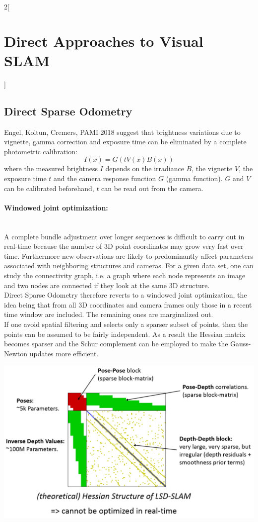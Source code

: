 \documentclass[oneside,fontsize=11pt,paper=a4]{scrartcl}
\newenvironment{myfigure}
  {\par\medskip\noindent\minipage{\linewidth}}
  {\endminipage\par\medskip}
\begin{document}
\begin{multicols}{2}[\section{Direct Approaches to Visual SLAM}]
\subsection{Direct Sparse Odometry}
Engel, Koltun, Cremers, PAMI 2018 suggest that brightness variations due to vignette, gamma correction and exposure time can be eliminated by a complete photometric calibration: \begin{equation*}
    I(x)=G \left(t V(x) B(x) \right)
\end{equation*}
where the measured brightness $I$ depends on the irradiance $B$, the vignette $V$, the exposure time $t$ and the camera response function $G$ (gamma function).
$G$ and $V$ can be calibrated beforehand, $t$ can be read out from the camera. \par

\paragraph{Windowed joint optimization:}\mbox{}\\
A complete bundle adjustment over longer sequences is difficult to carry out in real-time because the number of 3D point coordinates may grow very fast over time.
Furthermore new observations are likely to predominantly affect parameters associated with neighboring structures and cameras.
For a given data set, one can study the connectivity graph, i.e. a graph where each node represents an image and two nodes are connected if they look at the same 3D structure.\\
Direct Sparse Odometry therefore reverts to a windowed joint optimization, the idea being that from all 3D coordinates and camera frames only those in a recent time window are included. The remaining ones are marginalized out.\\
If one avoid spatial filtering and selects only a sparser subset of points, then the points can be assumed to be fairly independent.
As a result the Hessian matrix becomes sparser and the Schur complement can be employed to make the Gauss-Newton updates more efficient.

\begin{myfigure}
	\centering
	\includegraphics[width=0.9\linewidth]{Images/Direct_Sparse_Odometry.jpg}
\end{myfigure}


\end{multicols}
\end{document}
